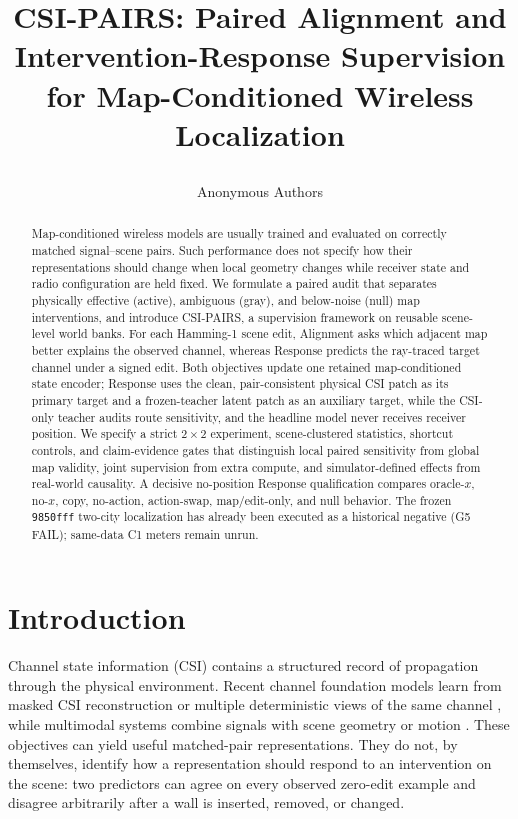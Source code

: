 \documentclass{article}
\title{\raggedright CSI-PAIRS: Paired Alignment and Intervention-Response
Supervision for Map-Conditioned Wireless Localization}
\author{Anonymous Authors}
\newcommand{\method}{CSI-PAIRS}
\begin{document}
\maketitle

\begin{abstract}
Map-conditioned wireless models are usually trained and evaluated on correctly
matched signal--scene pairs.  Such performance does not specify how their
representations should change when local geometry changes while receiver state
and radio configuration are held fixed.  We formulate a paired audit that
separates physically effective (active), ambiguous (gray), and below-noise
(null) map interventions, and introduce \method{}, a supervision framework on
reusable scene-level world banks.  For each Hamming-1 scene edit, Alignment asks
which adjacent map better explains the observed channel, whereas Response
predicts the ray-traced target channel under a signed edit.  Both objectives
update one retained map-conditioned state encoder; Response uses the clean,
pair-consistent physical CSI patch as its primary target and a frozen-teacher
latent patch as an auxiliary target, while the CSI-only teacher audits route sensitivity,
and the headline model never receives receiver position.  We specify a strict $2\times2$ experiment, scene-clustered
statistics, shortcut controls, and claim-evidence gates that distinguish local
paired sensitivity from global map validity, joint supervision from extra
compute, and simulator-defined effects from real-world causality.  A decisive
no-position Response qualification compares oracle-$x$, no-$x$, copy,
no-action, action-swap, map/edit-only, and null behavior.  The frozen
\texttt{9850fff} two-city localization has already been executed as a
historical negative (G5 FAIL); same-data C1 meters remain unrun.
\end{abstract}

\section{Introduction}

Channel state information (CSI) contains a structured record of propagation
through the physical environment.  Recent channel foundation models learn from
masked CSI reconstruction or multiple deterministic views of the same channel
\citep{jiang2026csimae,jiang2025csiclip,jiang2026csiclippp}, while multimodal
systems combine signals with scene geometry or motion
\citep{chen2026wwm,chu2026sigmap}.  These objectives can yield useful matched-pair
representations.  They do not, by themselves, identify how a representation
should respond to an intervention on the scene: two predictors can agree on
every observed zero-edit example and disagree arbitrarily after a wall is
inserted, removed, or changed.
\end{document}
